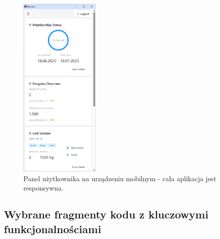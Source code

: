 \documentclass[../../spr.tex]{subfiles}
\begin{document}
\begin{figure}[H]
  \centering
  \includegraphics[width=0.35\textwidth]{img/client_dashboard_responsive.png}
  \caption{Panel użytkownika na urządzeniu mobilnym - cała aplikacja jest responsywna.}
\end{figure}


\subsection{Wybrane fragmenty kodu z kluczowymi funkcjonalnościami}
\end{document}
